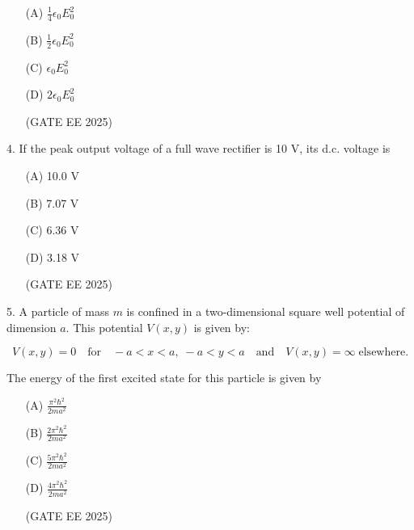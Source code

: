 \documentclass[twocolumn]{article}
\begin{document}
\begin{itemize}
\item[(A)] $\frac{1}{4} \epsilon_0 E_0^2$

\item[(B)] $\frac{1}{2} \epsilon_0 E_0^2$

\item[(C)] $\epsilon_0 E_0^2$

\item[(D)] $2 \epsilon_0 E_0^2$

(GATE EE 2025)
  \end{itemize}




4. If the peak output voltage of a full wave rectifier is 10 V, its d.c. voltage is

\begin{itemize}
\item[(A)] 10.0 V

\item[(B)] 7.07 V

\item[(C)] 6.36 V

\item[(D)] 3.18 V

(GATE EE 2025)
  \end{itemize}




5. A particle of mass $m$ is confined in a two-dimensional square well potential of dimension $a$.  
This potential $V(x,y)$ is given by:


\[
V(x,y) = 0 \quad \text{for} \quad -a < x < a,\; -a < y < a
\quad \text{and} \quad
V(x,y) = \infty \; \text{elsewhere}.
\]

The energy of the first excited state for this particle is given by

\begin{itemize}
\item[(A)] $\frac{\pi^2 \hbar^2}{2ma^2}$

\item[(B)] $\frac{2 \pi^2 \hbar^2}{2ma^2}$

\item[(C)] $\frac{5 \pi^2 \hbar^2}{2ma^2}$

\item[(D)] $\frac{4 \pi^2 \hbar^2}{2ma^2}$

(GATE EE 2025)
  \end{itemize}
\end{document}
